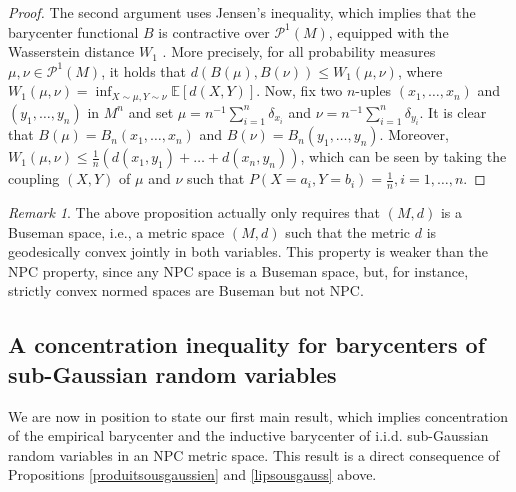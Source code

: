 \documentclass[10pt,a4paper]{article}
\theoremstyle{plain}
\theoremstyle{definition}
\theoremstyle{remark}
\newtheorem{remark}[theorem]{Remark}
\newcommand{\E}{\mathbb{E}}
\begin{document}
\begin{proof}


The second argument uses Jensen's inequality, which implies that the barycenter functional $B$ is contractive over $\mathcal{P}^1(M)$, equipped with the Wasserstein distance $W_1$ \cite[Theorem 6.3]{sturm03}. More precisely, for all probability measures $\mu,\nu\in\mathcal P^1(M)$, it holds that $d(B(\mu),B(\nu))\leq W_1(\mu,\nu)$, where $W_1(\mu,\nu)=\inf_{X\sim\mu,Y\sim\nu}\E[d(X,Y)]$. Now, fix two $n$-uples $(x_1,\ldots,x_n)$ and $(y_1,\ldots,y_n)$ in $M^n$ and set $\mu=n^{-1}\sum_{i=1}^n \delta_{x_i}$ and $\nu=n^{-1}\sum_{i=1}^n \delta_{y_i}$. It is clear that $B(\mu)=B_n(x_1,\ldots,x_n)$ and $B(\nu)=B_n(y_1,\ldots,y_n)$. Moreover, $W_1(\mu,\nu)\leq \frac{1}{n}(d(x_1,y_1)+\ldots+d(x_n,y_n))$, which can be seen by taking the coupling $(X,Y)$ of $\mu$ and $\nu$ such that $P(X=a_i, Y=b_i)=\frac{1}{n}, i=1,\ldots,n$. 
\end{proof}

\begin{remark}
    The above proposition actually only requires that $(M,d)$ is a Buseman space, i.e., a metric space $(M,d)$ such that the metric $d$ is geodesically convex jointly in both variables. This property is weaker than the NPC property, since any NPC space is a Buseman space, but, for instance, strictly convex normed spaces are Buseman but not NPC. 
\end{remark}

\subsection{A concentration inequality for barycenters of sub-Gaussian random variables}

We are now in position to state our first main result, which implies concentration of the empirical barycenter and the inductive barycenter of i.i.d. sub-Gaussian random variables in an NPC metric space. This result is a direct consequence of Propositions \ref{produitsousgaussien} and \ref{lipsousgauss} above.
\end{document}
